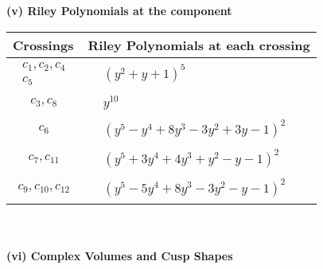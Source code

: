 \documentclass[1p]{elsarticle_modified}
\theoremstyle{definition}
\begin{document}
\newpage\renewcommand{\arraystretch}{1}
\flushleft \textbf{(v) Riley Polynomials at the component}\newline \\
\begin{tabular}{m{50pt}|m{274pt}}
Crossings & \hspace{64pt}Riley Polynomials at each crossing \\
\hline $$\begin{aligned}c_{1},c_{2},c_{4}\\c_{5}\end{aligned}$$&$\begin{aligned}
&(y^2+y+1)^5
\end{aligned}$\\
\hline $$\begin{aligned}c_{3},c_{8}\end{aligned}$$&$\begin{aligned}
&y^{10}
\end{aligned}$\\
\hline $$\begin{aligned}c_{6}\end{aligned}$$&$\begin{aligned}
&(y^5- y^4+8 y^3-3 y^2+3 y-1)^2
\end{aligned}$\\
\hline $$\begin{aligned}c_{7},c_{11}\end{aligned}$$&$\begin{aligned}
&(y^5+3 y^4+4 y^3+y^2- y-1)^2
\end{aligned}$\\
\hline $$\begin{aligned}c_{9},c_{10},c_{12}\end{aligned}$$&$\begin{aligned}
&(y^5-5 y^4+8 y^3-3 y^2- y-1)^2
\end{aligned}$\\
\hline
\end{tabular}\\~\\
\newpage\flushleft \textbf{(vi) Complex Volumes and Cusp Shapes}
\end{document}
